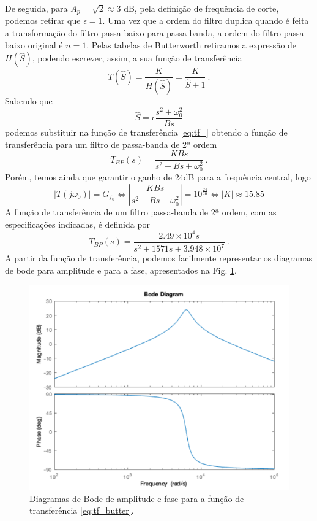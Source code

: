 De seguida, para $A_p = \sqrt{2} \approx 3$ dB, pela definição de frequência de corte, podemos retirar que $\epsilon = 1$. Uma vez que a ordem do filtro duplica quando é feita a transformação do filtro passa-baixo para passa-banda, a ordem do filtro passa-baixo original é $n=1$. Pelas tabelas de Butterworth retiramos a expressão de $H(\hat{S})$, podendo escrever, assim, a sua função de transferência 
\begin{equation}
\label{eq:tf_}
    T(\hat{S})= \frac{K}{H(\hat{S})}=\frac{K}{\hat{S} + 1}\:.
\end{equation}
Sabendo que
\begin{equation*}
    \hat{S} = \epsilon \frac{s^2 + \omega_0^2}{B s}
\end{equation*}
podemos substituir na função de transferência \eqref{eq:tf_} obtendo a função de transferência para um filtro de passa-banda de 2ª ordem
\begin{equation}
    T_{BP}(s)=\frac{KBs}{s^2 + Bs + \omega_0^2} \: .
    \label{eq:tbp}
\end{equation}
Porém, temos ainda que garantir o ganho de 24dB para a frequência central, logo
\begin{equation*}
    |T(j\omega_0)|= G_{f_0} \Leftrightarrow  \left|\frac{KBs}{s^2 + Bs + \omega_0^2}\right|= 10 ^{\frac{24}{20}} \Leftrightarrow |K|\approx15.85
\end{equation*}
A função de transferência de um filtro passa-banda de 2ª ordem, com as especificações indicadas, é definida por
\begin{equation}
    \label{eq:tf_butter}
    T_{BP}(s)=\frac{2.49 \times 10^4 s}{s^2 + 1571s + 3.948 \times 10^7} \: .
\end{equation}
A partir da função de transferência, podemos facilmente representar os diagramas de bode para amplitude e para a fase, apresentados na Fig. \ref{fig:bode_bp}.
\begin{figure}[ht]
    \centering
    \includegraphics[width = 0.7 \textwidth]{Imagens/bode_bp.png}
    \caption{Diagramas de Bode de amplitude e fase para a função de transferência \eqref{eq:tf_butter}.}
    \label{fig:bode_bp} 
\end{figure}

